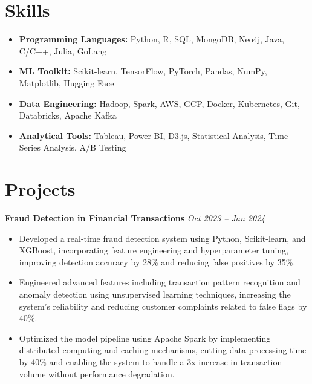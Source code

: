 \documentclass[a4paper,10pt]{article}
\begin{document}
\vspace{-0.3cm}

\section*{Skills}
\begin{itemize}[leftmargin=*]
    \item \textbf{Programming Languages:} Python, R, SQL, MongoDB, Neo4j, Java, C/C++, Julia, GoLang
    \item \textbf{ML Toolkit:} Scikit-learn, TensorFlow, PyTorch, Pandas, NumPy, Matplotlib, Hugging Face
    \item \textbf{Data Engineering:} Hadoop, Spark, AWS, GCP, Docker, Kubernetes, Git, Databricks, Apache Kafka
    \item \textbf{Analytical Tools:} Tableau, Power BI, D3.js, Statistical Analysis, Time Series Analysis, A/B Testing
\end{itemize}

\vspace{-0.3cm}

\section*{Projects}
\noindent\textbf{Fraud Detection in Financial Transactions} \hfill \textit{Oct 2023 – Jan 2024}
\begin{itemize}[leftmargin=*]
    \item Developed a real-time fraud detection system using Python, Scikit-learn, and XGBoost, incorporating feature engineering and hyperparameter tuning, improving detection accuracy by 28\% and reducing false positives by 35\%.
    \item Engineered advanced features including transaction pattern recognition and anomaly detection using unsupervised learning techniques, increasing the system's reliability and reducing customer complaints related to false flags by 40\%.
    \item Optimized the model pipeline using Apache Spark by implementing distributed computing and caching mechanisms, cutting data processing time by 40\% and enabling the system to handle a 3x increase in transaction volume without performance degradation.
\end{itemize}

\vspace{0.1cm}
\end{document}
